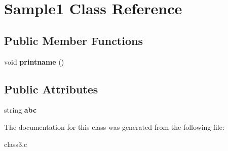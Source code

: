 \hypertarget{classSample1}{}\section{Sample1 Class Reference}
\label{classSample1}
\subsection*{Public Member Functions}
\begin{DoxyCompactItemize}
\item 
\mbox{\label{classSample1_afc8ed918342034db1e43c3799672ca4f}} 
void {\bfseries printname} ()
\end{DoxyCompactItemize}
\subsection*{Public Attributes}
\begin{DoxyCompactItemize}
\item 
\mbox{\label{classSample1_a8bcdc2fdc70c74a96a7f719b3115f58c}} 
string {\bfseries abc}
\end{DoxyCompactItemize}


The documentation for this class was generated from the following file\+:\begin{DoxyCompactItemize}
\item 
class3.\+c\end{DoxyCompactItemize}
